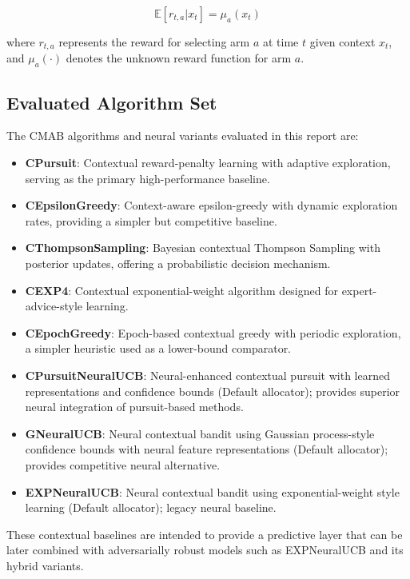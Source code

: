 \documentclass[12pt,a4paper]{article}
\begin{document}
\begin{equation}
\mathbb{E}[r_{t,a} | x_t] = \mu_a(x_t)
\end{equation}

where $r_{t,a}$ represents the reward for selecting arm $a$ at time $t$ given context $x_t$, and $\mu_a(\cdot)$ denotes the unknown reward function for arm $a$.

\subsection{Evaluated Algorithm Set}

The CMAB algorithms and neural variants evaluated in this report are:

\begin{itemize}
\item \textbf{CPursuit}: Contextual reward-penalty learning with adaptive exploration, serving as the primary high-performance baseline.
\item \textbf{CEpsilonGreedy}: Context-aware epsilon-greedy with dynamic exploration rates, providing a simpler but competitive baseline.
\item \textbf{CThompsonSampling}: Bayesian contextual Thompson Sampling with posterior updates, offering a probabilistic decision mechanism.
\item \textbf{CEXP4}: Contextual exponential-weight algorithm designed for expert-advice-style learning.
\item \textbf{CEpochGreedy}: Epoch-based contextual greedy with periodic exploration, a simpler heuristic used as a lower-bound comparator.
\item \textbf{CPursuitNeuralUCB}: Neural-enhanced contextual pursuit with learned representations and confidence bounds (Default allocator); provides superior neural integration of pursuit-based methods.
\item \textbf{GNeuralUCB}: Neural contextual bandit using Gaussian process-style confidence bounds with neural feature representations (Default allocator); provides competitive neural alternative.
\item \textbf{EXPNeuralUCB}: Neural contextual bandit using exponential-weight style learning (Default allocator); legacy neural baseline.
\end{itemize}

These contextual baselines are intended to provide a predictive layer that can be later combined with adversarially robust models such as EXPNeuralUCB and its hybrid variants.
\end{document}
